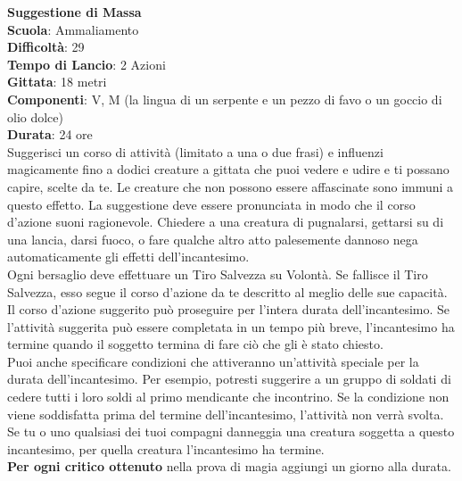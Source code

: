\begin{multicols}{2}
\medskip\textbf{Suggestione di Massa}\\
\textbf{Scuola}: Ammaliamento\\
\textbf{Difficoltà}: 29\\
\textbf{Tempo di Lancio}: 2 Azioni\\
\textbf{Gittata}: 18 metri\\
\textbf{Componenti}: V, M (la lingua di un serpente e un pezzo di favo o un goccio di olio dolce)\\
\textbf{Durata}: 24 ore\\
Suggerisci un corso di attività (limitato a una o due frasi) e influenzi magicamente fino a dodici creature a gittata che puoi vedere e udire e ti possano capire, scelte da te. Le creature che non possono essere affascinate sono immuni a questo effetto. La suggestione deve essere pronunciata in modo che il corso d'azione suoni ragionevole. Chiedere a una creatura di pugnalarsi, gettarsi su di una lancia, darsi fuoco, o fare qualche altro atto palesemente dannoso nega automaticamente gli effetti dell'incantesimo.\\
Ogni bersaglio deve effettuare un Tiro Salvezza su Volontà. Se fallisce il Tiro Salvezza, esso segue il corso d'azione da te descritto al meglio delle sue capacità. Il corso d'azione suggerito può proseguire per l'intera durata dell'incantesimo. Se l'attività suggerita può essere completata in un tempo più breve, l'incantesimo ha termine quando il soggetto termina di fare ciò che gli è stato chiesto.\\
Puoi anche specificare condizioni che attiveranno un'attività speciale per la durata dell'incantesimo. Per esempio, potresti suggerire a un gruppo di soldati di cedere tutti i loro soldi al primo mendicante che incontrino. Se la condizione non viene soddisfatta prima del termine dell'incantesimo, l'attività non verrà svolta. Se tu o uno qualsiasi dei tuoi compagni danneggia una creatura soggetta a questo incantesimo, per quella creatura l'incantesimo ha termine.\\
\textbf{Per ogni critico ottenuto} nella prova di magia aggiungi un giorno alla durata.


\end{multicols}
